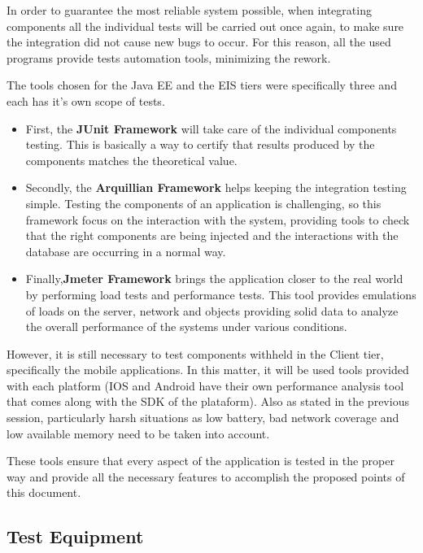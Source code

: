 \documentclass[a4paper]{article}
\begin{document}
In order to guarantee the most reliable system possible, when integrating components all the individual tests will be carried out once again, to make sure the integration did not cause new bugs to occur. For this reason, all the used programs provide tests automation tools, minimizing the rework. 

The tools chosen for the Java EE and the EIS tiers were specifically three and each has it’s own scope of tests.

\begin{itemize}
\item First, the \textbf{JUnit Framework} will take care of the individual components testing. This is basically a way to certify that results produced by the components matches the theoretical value.

\item Secondly, the \textbf{Arquillian Framework} helps keeping the integration testing simple. Testing the components of an application is challenging, so this framework focus on the interaction with the system, providing tools to check that the right components are being injected and the interactions with the database are occurring in a normal way. 

\item Finally,\textbf{Jmeter Framework} brings the application closer to the real world by performing load tests and performance tests. This tool provides emulations of loads on the server, network and objects providing solid data to analyze the overall performance of the systems under various conditions.
\end{itemize}
However, it is still necessary to  test components withheld in the Client tier,  specifically the mobile applications. In this matter, it will be used tools provided with each platform (IOS and Android have their own performance analysis tool that comes along with the SDK of the plataform). Also as stated in the previous session, particularly harsh situations as low battery, bad network coverage and low available memory need to be taken into account. 

These tools ensure that every aspect of the application is tested in the proper way and provide all the necessary features to accomplish the proposed points of this document.
\newpage

\subsection{Test Equipment}
\end{document}
